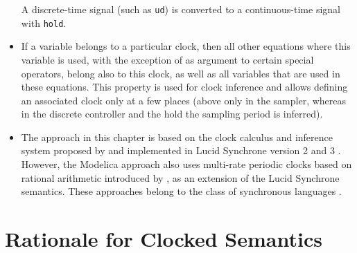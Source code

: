 \begin{itemize}
  A discrete-time signal (such as \lstinline!ud!) is converted to a continuous-time signal with \lstinline!hold!.
\item
  If a variable belongs to a particular clock, then all other equations where this variable is used, with the exception of as argument to certain special operators, belong also to this clock, as well as all variables that are used in these equations.
  This property is used for clock inference and allows defining an associated clock only at a few places (above only in the sampler, whereas in the discrete controller and the hold the sampling period is inferred).
\item
  The approach in this chapter is based on the clock calculus and inference system proposed by \textcite{ColacoPouzet2003ClocksFirstClass} and implemented in Lucid Synchrone version 2 and 3 \parencite{Pouzet2006LucidSynchrone30}.
  However, the Modelica approach also uses multi-rate periodic clocks based on rational arithmetic introduced by \textcite{ForgetEtAl2008MultiPeriodic}, as an extension of the Lucid Synchrone semantics.
  These approaches belong to the class of synchronous languages \parencite{BenvenisteEtAl2003SynchronousTwelveYearsLater}.
\end{itemize}

\section{Rationale for Clocked Semantics}\label{rationale-for-clocked-semantics}


